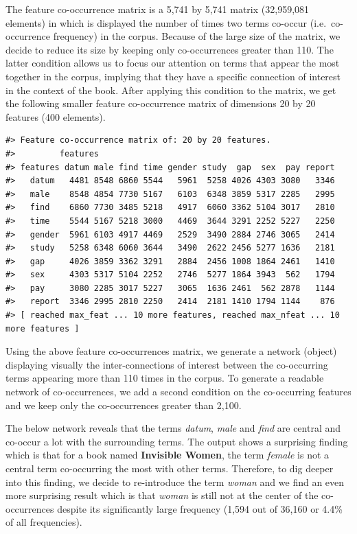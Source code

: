 \documentclass[
]{article}
\begin{document}
The feature co-occurrence matrix is a 5,741 by 5,741 matrix (32,959,081
elements) in which is displayed the number of times two terms co-occur
(i.e.~co-occurrence frequency) in the corpus. Because of the large size
of the matrix, we decide to reduce its size by keeping only
co-occurrences greater than 110. The latter condition allows us to focus
our attention on terms that appear the most together in the corpus,
implying that they have a specific connection of interest in the context
of the book. After applying this condition to the matrix, we get the
following smaller feature co-occurrence matrix of dimensions 20 by 20
features (400 elements).

\begin{verbatim}
#> Feature co-occurrence matrix of: 20 by 20 features.
#>         features
#> features datum male find time gender study  gap  sex  pay report
#>   datum   4481 8548 6860 5544   5961  5258 4026 4303 3080   3346
#>   male    8548 4854 7730 5167   6103  6348 3859 5317 2285   2995
#>   find    6860 7730 3485 5218   4917  6060 3362 5104 3017   2810
#>   time    5544 5167 5218 3000   4469  3644 3291 2252 5227   2250
#>   gender  5961 6103 4917 4469   2529  3490 2884 2746 3065   2414
#>   study   5258 6348 6060 3644   3490  2622 2456 5277 1636   2181
#>   gap     4026 3859 3362 3291   2884  2456 1008 1864 2461   1410
#>   sex     4303 5317 5104 2252   2746  5277 1864 3943  562   1794
#>   pay     3080 2285 3017 5227   3065  1636 2461  562 2878   1144
#>   report  3346 2995 2810 2250   2414  2181 1410 1794 1144    876
#> [ reached max_feat ... 10 more features, reached max_nfeat ... 10 more features ]
\end{verbatim}

Using the above feature co-occurrences matrix, we generate a network
(object) displaying visually the inter-connections of interest between
the co-occurring terms appearing more than 110 times in the corpus. To
generate a readable network of co-occurrences, we add a second condition
on the co-occurring features and we keep only the co-occurrences greater
than 2,100.

The below network reveals that the terms \emph{datum}, \emph{male} and
\emph{find} are central and co-occur a lot with the surrounding terms.
The output shows a surprising finding which is that for a book named
\textbf{Invisible Women}, the term \emph{female} is not a central term
co-occurring the most with other terms. Therefore, to dig deeper into
this finding, we decide to re-introduce the term \emph{woman} and we
find an even more surprising result which is that \emph{woman} is still
not at the center of the co-occurrences despite its significantly large
frequency (1,594 out of 36,160 or 4.4\% of all frequencies).
\end{document}
